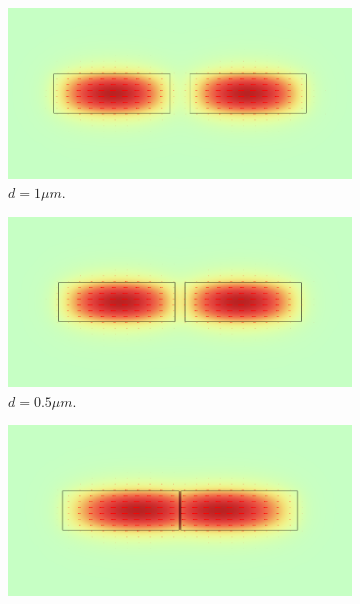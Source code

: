 \documentclass[a4paper,12pt]{article}
\begin{document}
\begin{figure}[H]
    \centering
    \begin{subfigure}{0.45\textwidth}
        \centering
        \includegraphics[scale=0.32]{SiO2_SiO2_normE_0_d1um.png}
        \caption{$d = 1\mu m$.}
    \end{subfigure}
    \hfill
    \begin{subfigure}{0.45\textwidth}
        \centering
        \includegraphics[scale=0.32]{SiO2_SiO2_normE_0_d0.5um.png}
        \caption{$d = 0.5\mu m$.}
    \end{subfigure}
    \hfill
    \begin{subfigure}{0.45\textwidth}
        \centering
        \includegraphics[scale=0.32]{SiO2_SiO2_normE_0_d0.1um.png}

\end{subfigure}
\end{figure}
\end{document}
